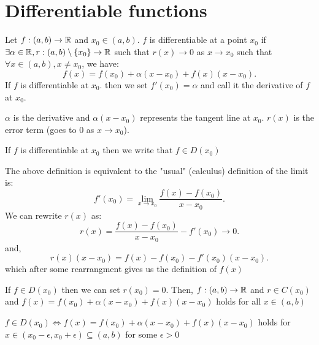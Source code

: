 \documentclass[a4paper]{article}
\begin{document}
\section{Differentiable functions}
\begin{definition}  
  Let $f: (a,b) \to \mathbb{R}$ and $x_0 \in (a,b)$. $f$ is differentiable at a point  $x_0$ if $\exists \alpha \in \mathbb{R}, r: (a,b) \setminus \{x_0\}  \to  \mathbb{R}$ such that $r(x) \to 0 $ as  $x \to x_0$ such that  $\forall x \in (a,b), x \neq x_0$, we have:
  \[
   f(x) = f(x_0) + \alpha (x-x_0) + f(x) (x-  x_0)
 .\] 
  If $f$ is differentiable at  $x_0$. then we set  $f'(x_0) = \alpha$ and call it the derivative of $f$ at  $x_0$.  
  \begin{note}
   $\alpha$ is the derivative and $\alpha(x - x_0)$ represents the tangent line at  $x_0$. $r(x)$ is the error term (goes to 0 as $x \to x_0$). 
  \end{note}
\end{definition}

\begin{note}
  If $f$ is differentiable at  $x_0$ then we write that $f \in D(x_0)$
\end{note}

\begin{remark}
  The above definition is equivalent to the "usual" (calculus) definition of the limit is:
  \[
  f'(x_0) = \lim_{x \to x_0} \frac{f(x) - f(x_0)}{x - x_0} 
  .\]
  We can rewrite $r(x)$ as:
   \[
  r(x) = \frac{f(x) - f(x_0)}{x - x_0} - f'(x_0) \to 0
  .\]
  and,
  \[
  r(x) (x- x_0) = f(x) - f(x_0) - f'(x_0) (x-x_0)
  .\] 
  which after some rearrangment gives us the definition of $f(x)$
\end{remark}

\begin{remark}
  If $f \in D(x_0)$ then we can set $r(x_0) = 0$. Then, $f: \left( a,b \right) \to \mathbb{R} $ and $r \in C(x_0)$ and $  f(x) = f(x_0) + \alpha (x-x_0) + f(x) (x-  x_0)$ holds for all $x \in \left( a,b \right) $ 
\end{remark}

\begin{remark}
  $f \in D(x_0) \iff  f(x) = f(x_0) + \alpha (x-x_0) + f(x) (x-  x_0)$ holds for $x \in (x_0 - \epsilon, x_0 + \epsilon) \subseteq (a, b)$ for some $\epsilon > 0$
\end{remark}
\end{document}
